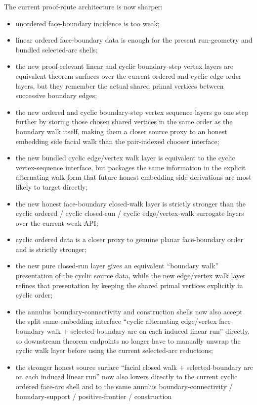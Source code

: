 \documentclass[11pt]{article}
\begin{document}
The current proof-route architecture is now sharper:
\begin{itemize}
\item unordered face-boundary incidence is too weak;
\item linear ordered face-boundary data is enough for the present run-geometry
and bundled selected-arc shells;
\item the new proof-relevant linear and cyclic boundary-step vertex layers are
equivalent theorem surfaces over the current ordered and cyclic edge-order
layers, but they remember the actual shared primal vertices between successive
boundary edges;
\item the new ordered and cyclic boundary-step vertex sequence layers go one
step further by storing those chosen shared vertices in the same order as the
boundary walk itself, making them a closer source proxy to an honest embedding
side facial walk than the pair-indexed chooser interface;
\item the new bundled cyclic edge/vertex walk layer is equivalent to the cyclic
vertex-sequence interface, but packages the same information in the explicit
alternating walk form that future honest embedding-side derivations are most
likely to target directly;
\item the new honest face-boundary closed-walk layer is strictly stronger than
the cyclic ordered / cyclic closed-run / cyclic edge/vertex-walk surrogate
layers over the current weak API;
\item cyclic ordered data is a closer proxy to genuine planar face-boundary
order and is strictly stronger;
\item the new pure closed-run layer gives an equivalent ``boundary walk''
presentation of the cyclic source data, while the new edge/vertex walk layer
refines that presentation by keeping the shared primal vertices explicitly in
cyclic order;
\item the annulus boundary-connectivity and construction shells now also accept
the split same-embedding interface ``cyclic alternating edge/vertex
face-boundary walk + selected-boundary arc on each induced linear run''
directly, so downstream theorem endpoints no longer have to manually unwrap the
cyclic walk layer before using the current selected-arc reductions;
\item the stronger honest source surface ``facial closed walk +
selected-boundary arc on each induced linear run'' now also lowers directly to
the current cyclic ordered face-arc shell and to the same annulus
boundary-connectivity / boundary-support / positive-frontier / construction

\end{itemize}
\end{document}
